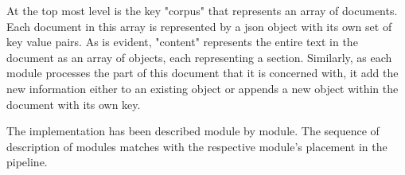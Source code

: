 \documentclass[12pt]{scrreprt}
\begin{document}
At the top most level is the key "corpus" that represents an array of documents.
Each document in this array is represented by a json object with its own set of key value pairs.
As is evident, "content" represents the entire text in the document as an array of objects, each representing a section.
Similarly, as each module processes the part of this document that it is concerned with, it add the new information either to an existing object or appends a new object within the document with its own key.

The implementation has been described module by module. The sequence of description of modules matches with the respective module's placement in the pipeline.
\end{document}
